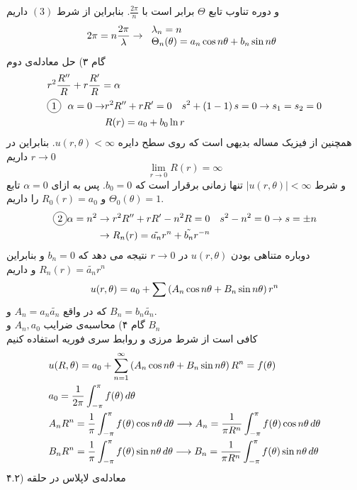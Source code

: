 و دوره تناوب تابع
$\Theta$
برابر است با
$\frac{2\pi}{n}$.
بنابراین از شرط
$(3)$
داریم
\[
2\pi=n\frac{2\pi}\lambda\rightarrow\begin{tabular}{l}
	$\lambda_n=n$
	\\
	$\Theta_n(\theta)=a_n\cos{n\theta}+b_n\sin{n\theta}$
\end{tabular}
\]
گام ۳) حل معادله‌ی دوم
\[\begin{aligned}
	& r^2\frac{R^{\prime\prime}}R+r\frac{R^\prime}{R}=\alpha
	\\ & 
	\begin{aligned}
	\circled1 \ \ \alpha=0\rightarrow & r^2R^{\prime\prime}+rR^\prime=0 \quad s^2+\pr{1-1}s=0\rightarrow s_1=s_2=0
	\\ &
	R(r)=a_0+b_0\ln{r}
	\end{aligned}
\end{aligned}\]
همچنین از فیزیک مساله بدیهی است که روی سطح دایره
$u(r,\theta)<\infty$.
بنابراین در
$r\to0$
داریم
\[
\lim_{r\to0} R(r)=\infty
\]
و شرط
$\left|u(r,\theta)\right|<\infty$
تنها زمانی برقرار است که
$b_0=0$.
پس به ازای
$\alpha=0$
تابع
$\Theta_0(\theta)=1$
و
$R_0(r)=a_0$
را داریم.
\[\begin{aligned}
	\circled2 \alpha=n^2 & \rightarrow r^2R^{\prime\prime}+rR^\prime-n^2R=0 \quad s^2-n^2=0\rightarrow s=\pm n
	\\ & \rightarrow
	R_n(r)=\tilde{a_n}r^n+\tilde{b_n}r^{-n}
\end{aligned}\]
دوباره متناهی بودن
$u(r,\theta)$
در
$r\to0$
نتیجه می دهد که
$b_n=0$
و بنابراین
$R_n(r)=\tilde{a_n}r^n$
و داریم
\[
u(r,\theta)=a_0+\sum\left(A_n\cos{n\theta}+B_n\sin{n\theta}\right)r^n
\]
که در واقع
$A_n=a_n\tilde{a_n}$
و
$B_n=b_n\tilde{a_n}$.\\
گام ۴) محاسبه‌ی ضرایب
$A_n,a_0$
و
$B_n$\\
کافی است از شرط مرزی و روابط سری فوریه استفاده کنیم
\[\begin{aligned}
	& u(R,\theta)=a_0+\sum_{n=1}^\infty\left(A_n\cos{n\theta}+B_n\sin{n\theta}\right)R^n=f(\theta)
	\\ &
	a_0=\frac1{2\pi}\int_{-\pi}^\pi f(\theta)\, d\theta
	\\ &
	A_nR^n=\frac1\pi\int_{-\pi}^\pi f(\theta)\cos{n\theta}\, d\theta\longrightarrow A_n=\frac1{\pi R^n}\int_{-\pi}^\pi f(\theta)\cos{n\theta}\, d\theta
	\\ &
	B_nR^n=\frac1\pi\int_{-\pi}^\pi f(\theta)\sin{n\theta}\, d\theta\longrightarrow B_n=\frac1{\pi R^n}\int_{-\pi}^\pi f(\theta)\sin{n\theta}\, d\theta
\end{aligned}\]
۴.۲) معادله‌ی لاپلاس در حلقه

